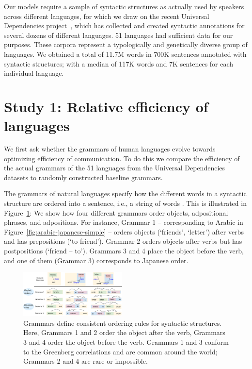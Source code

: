 \documentclass[9pt,twocolumn,twoside,lineno]{pnas-new}
\begin{document}
Our models require a sample of  syntactic structures as actually used by speakers across different languages, for which we draw on the recent
Universal Dependencies project~\cite{ud2.1}, which has collected and created syntactic annotations for several dozens of different languages.
51 languages had sufficient data for our purposes. 
These corpora represent a typologically and genetically diverse group of languages. %
We obtained a total of 11.7M words in 700K sentences annotated with syntactic structures; with a median of 117K words and 7K sentences for each individual language.



\section*{Study 1: Relative efficiency of languages}
\label{sec:relative-efficiency}

We first ask whether the grammars of human languages evolve towards optimizing efficiency of communication.  To do this we
compare the efficiency of the actual grammars of the 51 languages from the Universal Dependencies datasets to randomly constructed baseline grammars.
 

The grammars of natural languages specify how the different words in a syntactic structure are ordered into a sentence, i.e., a string of words  \cite{adger2015syntax}.
This is illustrated in Figure~\ref{fig:grammars}:
We show how four different grammars order objects, adpositional phrases, and adpositions.
For instance, Grammar 1 -- corresponding to Arabic in Figure~\ref{fig:arabic-japanese-simple} -- orders objects (`friends', `letter') after verbs and has prepositions (`to friend').
Grammar 2 orders objects after verbs but has postpositions (`friend -- to').
Grammars 3 and 4 place the object before the verb, and one of them (Grammar 3) corresponds to Japanese order.

\begin{figure}[ht]
    \centering
    \includegraphics[width=0.48\textwidth]{figures/grammar-langs-fontsize-friends.png}
	\caption{Grammars define consistent ordering rules for syntactic structures. Here, Grammars 1 and 2 order the object after the verb, Grammars 3 and 4 order the object before the verb. Grammars 1 and 3 conform to the Greenberg correlations and are common around the world; Grammars 2 and 4 are rare or impossible.}
	\label{fig:grammars}
\end{figure}
\end{document}
